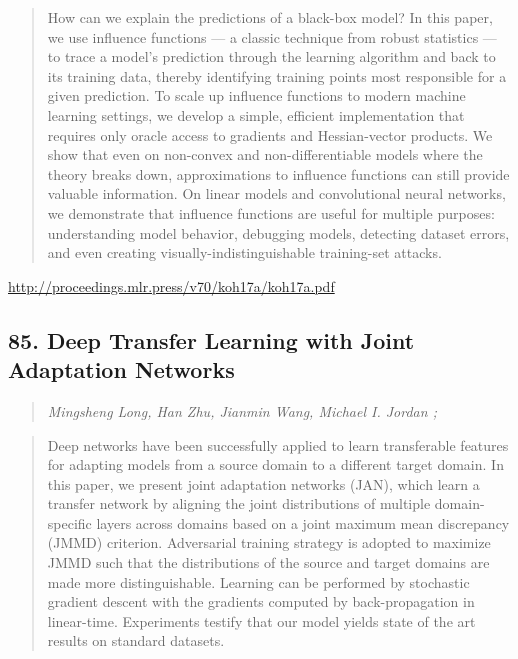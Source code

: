 \documentclass{article}
\begin{document}
\begin{quote}
    How can we explain the predictions of a black-box model? In this paper, we use influence functions — a classic technique from robust statistics — to trace a model’s prediction through the learning algorithm and back to its training data, thereby identifying training points most responsible for a given prediction. To scale up influence functions to modern machine learning settings, we develop a simple, efficient implementation that requires only oracle access to gradients and Hessian-vector products. We show that even on non-convex and non-differentiable models where the theory breaks down, approximations to influence functions can still provide valuable information. On linear models and convolutional neural networks, we demonstrate that influence functions are useful for multiple purposes: understanding model behavior, debugging models, detecting dataset errors, and even creating visually-indistinguishable training-set attacks.  
\end{quote}

\href{http://proceedings.mlr.press/v70/koh17a/koh17a.pdf}{http://proceedings.mlr.press/v70/koh17a/koh17a.pdf}

\subsection{85. Deep Transfer Learning with Joint Adaptation Networks}

\begin{quote}
\footnotesize{\textit{Mingsheng Long, Han Zhu, Jianmin Wang, Michael I. Jordan ;}}

\end{quote}

\begin{quote}
    Deep networks have been successfully applied to learn transferable features for adapting models from a source domain to a different target domain. In this paper, we present joint adaptation networks (JAN), which learn a transfer network by aligning the joint distributions of multiple domain-specific layers across domains based on a joint maximum mean discrepancy (JMMD) criterion. Adversarial training strategy is adopted to maximize JMMD such that the distributions of the source and target domains are made more distinguishable. Learning can be performed by stochastic gradient descent with the gradients computed by back-propagation in linear-time. Experiments testify that our model yields state of the art results on standard datasets.  
\end{quote}
\end{document}
